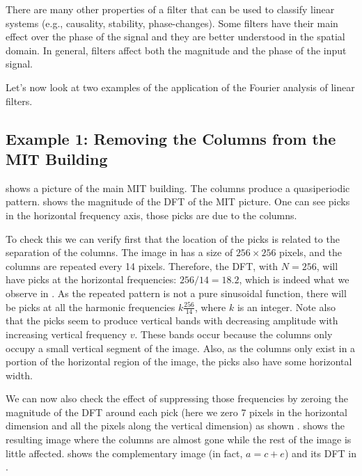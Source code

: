 There are many other properties of a filter that can be used to classify linear systems (e.g., causality, stability, phase-changes). Some filters have their main effect over the phase of the signal and they are better understood in the spatial domain. In general, filters affect both the magnitude and the phase of the input signal.

%
%
%
%




Let's now look at two examples of the application of the Fourier analysis of linear filters.


\subsection{Example 1: Removing the Columns from the MIT Building}

 shows a picture of the main MIT building. The columns produce a quasiperiodic pattern.  shows the magnitude of the DFT of the MIT picture. One can see picks in the horizontal frequency axis, those picks are due to the columns.

To check this we can verify first that the location of the picks is related to the separation of the columns. The image in  has a size of $256\times256$ pixels, and the columns are repeated every 14 pixels. Therefore, the DFT, with $N=256$, will have picks at the horizontal frequencies: $256/14=18.2$, which is indeed what we observe in . As the repeated pattern is not a pure sinusoidal function, there will be picks at all the harmonic frequencies $k\frac{256}{14}$, where $k$ is an integer. Note also that the picks seem to produce vertical bands with decreasing amplitude with increasing vertical frequency $v$. These bands occur because the columns only occupy a small vertical segment of the image. Also, as the columns only exist in a portion of the horizontal region of the image, the picks also have some horizontal width.

We can now also check the effect of suppressing those frequencies by zeroing the magnitude of the DFT around each pick (here we zero 7 pixels in the horizontal dimension and all the pixels along the vertical dimension) as shown .  shows the resulting image where the columns are almost gone while the rest of the image is little affected.  shows the complementary image (in fact, $a=c+e$) and its DFT in .


